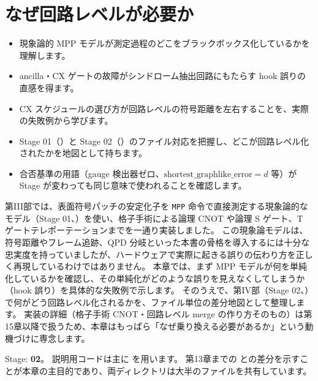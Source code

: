 \chapter{なぜ回路レベルが必要か}\label{ch:why_circuit_level}

\begin{chaptergoal}
  \begin{itemize}
  \item 現象論的 MPP モデルが測定過程のどこをブラックボックス化しているかを理解します。
  \item ancilla・CX ゲートの故障がシンドローム抽出回路にもたらす hook 誤りの直感を得ます。
  \item CX スケジュールの選び方が回路レベルの符号距離を左右することを、実際の失敗例から学びます。
  \item Stage 01（）と Stage 02（）のファイル対応を把握し、どこが回路レベル化されたかを地図として持ちます。
  \item 合否基準の用語（gauge 検出器ゼロ、$\mathrm{shortest\_graphlike\_error}=d$ 等）が Stage が変わっても同じ意味で使われることを確認します。
  \end{itemize}
\end{chaptergoal}

第III部では、表面符号パッチの安定化子を \texttt{MPP} 命令で直接測定する現象論的なモデル（Stage 01、）を使い、格子手術による論理 CNOT や論理 S ゲート、T ゲートテレポーテーションまでを一通り実装しました。
この現象論モデルは、符号距離やフレーム追跡、QPD 分岐といった本書の骨格を導入するには十分な忠実度を持っていましたが、ハードウェアで実際に起きる誤りの伝わり方を正しく再現しているわけではありません。
本章では、まず MPP モデルが何を単純化しているかを確認し、その単純化がどのような誤りを見えなくしてしまうか（hook 誤り）を具体的な失敗例で示します。
そのうえで、第IV部（Stage 02、）で何がどう回路レベル化されるかを、ファイル単位の差分地図として整理します。
実装の詳細（格子手術 CNOT・回路レベル merge の作り方そのもの）は第15章以降で扱うため、本章はもっぱら「なぜ乗り換える必要があるか」という動機づけに専念します。

\begin{notebox}
  Stage: \textbf{02}。
  説明用コードは主に  を用います。
  第13章までの  との差分を示すことが本章の主目的であり、両ディレクトリは大半のファイルを共有しています。
\end{notebox}

